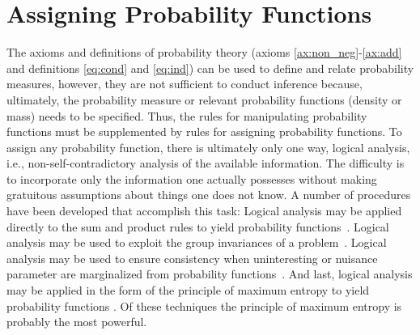 \chapter{Assigning Probability Functions}
The axioms and definitions of probability theory (axioms \ref{ax:non_neg}-\ref{ax:add} and definitions \ref{eq:cond} and \ref{eq:ind}) can be used to define and relate probability measures, however, they are not sufficient to conduct inference because, ultimately, the probability measure or relevant probability functions (density or mass) needs to be specified. Thus, the rules for manipulating probability functions must be supplemented by rules for assigning probability functions. To assign any probability function, there is ultimately only one way, logical analysis, i.e., non-self-contradictory analysis of the available information. The difficulty is to incorporate only the information one actually possesses without making gratuitous assumptions about things one does not know. A number of procedures have been developed that accomplish this task: Logical analysis may be applied directly to the sum and product rules to yield probability functions~\citep{jaynes_11}. Logical analysis may be used to exploit the group invariances of a problem~\citep{jaynes_16}. Logical analysis may be used to ensure consistency when uninteresting or nuisance parameter are marginalized from probability functions~\citep{jaynes_21}. And last, logical analysis may be applied in the form of the principle of maximum entropy to yield probability functions \cite{zellner_bayesian_inference, jaynes_16,jaynes_19, shore_17,shore_18}. Of these techniques the principle of maximum entropy is probably the most powerful.

